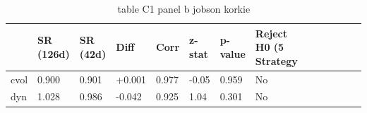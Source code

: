 \begin{table}[htbp]
  \centering
  \caption{table C1 panel b jobson korkie}
  \label{tab:table_C1_panel_b_jobson_korkie}
  \begin{tabular}{llllllll}
\toprule
 & SR (126d) & SR (42d) & Diff & Corr & z-stat & p-value & Reject H0 (5%
Strategy &  &  &  &  &  &  &  \\
\midrule
cvol & 0.900 & 0.901 & +0.001 & 0.977 & -0.05 & 0.959 & No \\
dyn & 1.028 & 0.986 & -0.042 & 0.925 & 1.04 & 0.301 & No \\
\bottomrule
\end{tabular}

\end{table}
